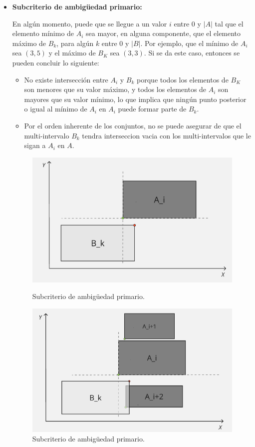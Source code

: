 \begin{itemize}
    \item \textbf{Subcriterio de ambigüedad primario:} 

    En algún momento, puede que se llegue a un valor $i$ entre 0 y $|A|$ tal que el elemento mínimo de $A_i$ sea mayor, en alguna componente, que el elemento máximo de $B_k$, para algún $k$ entre 0 y $|B|$. Por ejemplo, que el mínimo de $A_i$ sea $(3,5)$ y el máximo de $B_K$ sea $(3,3)$. Si se da este caso, entonces se pueden concluir lo siguiente:

    \begin{itemize}
    \item No existe intersección entre $A_i$ y $B_k$ porque todos los elementos de $B_K$ son menores que su valor máximo, y todos los elementos de $A_i$ son mayores que su valor mínimo, lo que implica que ningún punto posterior o igual al mínimo de $A_i$ en $A_i$ puede formar parte de $B_k$.
    
    \item Por el orden inherente de los conjuntos, no se puede asegurar de que el multi-intervalo $B_k$ tendra interseccion vacia con los multi-intervalos que le sigan a $A_i$ en $A$.
    \end{itemize}

    \begin{figure}[h]
     \centering
    \includegraphics[width=0.6\linewidth]{figures/Optimazaciones/Interseccion/criterio de amb prim 1.png}\par
    \caption{Subcriterio de ambigüedad primario.}
    \label{fig:enter-label}

    \vspace{0.5cm}

    \includegraphics[width=0.6\linewidth]{figures/Optimazaciones/Interseccion/criterio de amb prim 2.png}\par
    \caption{Subcriterio de ambigüedad primario.}
    \label{fig:enter-label}
    

\end{figure}
\end{itemize}
